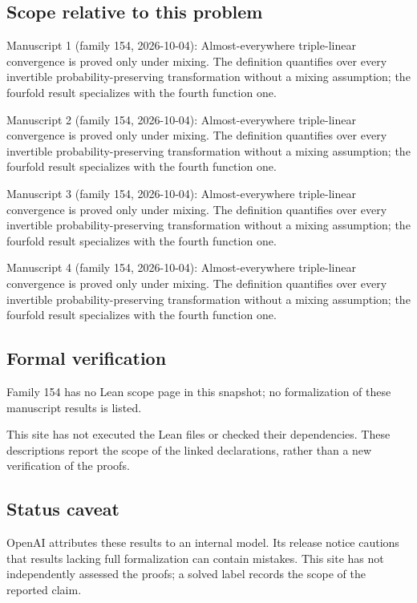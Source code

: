 \documentclass[11pt]{article}
\begin{document}
\subsection{Scope relative to this problem}
Manuscript 1 (family 154, 2026-10-04): Almost-everywhere triple-linear convergence is proved only under mixing. The definition quantifies over every invertible probability-preserving transformation without a mixing assumption; the fourfold result specializes with the fourth function one.

Manuscript 2 (family 154, 2026-10-04): Almost-everywhere triple-linear convergence is proved only under mixing. The definition quantifies over every invertible probability-preserving transformation without a mixing assumption; the fourfold result specializes with the fourth function one.

Manuscript 3 (family 154, 2026-10-04): Almost-everywhere triple-linear convergence is proved only under mixing. The definition quantifies over every invertible probability-preserving transformation without a mixing assumption; the fourfold result specializes with the fourth function one.

Manuscript 4 (family 154, 2026-10-04): Almost-everywhere triple-linear convergence is proved only under mixing. The definition quantifies over every invertible probability-preserving transformation without a mixing assumption; the fourfold result specializes with the fourth function one.

\subsection{Formal verification}
Family 154 has no Lean scope page in this snapshot; no formalization of these manuscript results is listed.

This site has not executed the Lean files or checked their dependencies. These descriptions report the scope of the linked declarations, rather than a new verification of the proofs.

\subsection{Status caveat}
OpenAI attributes these results to an internal model. Its release notice cautions that results lacking full formalization can contain mistakes. This site has not independently assessed the proofs; a solved label records the scope of the reported claim.
\end{document}
